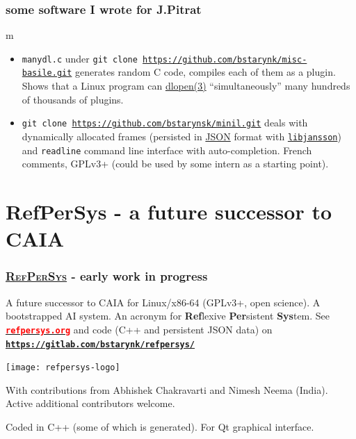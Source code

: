 \documentclass[xcolor=svgnames,final,smaller,a4]{beamer}
\newcommand{\RefPerSys}{\href{http://refpersys.org}{\textsc{RefPerSys}}}
\begin{document}
 \begin{frame}
   \frametitle{some software I wrote for J.Pitrat}
m
   \begin{itemize}
     \item \texttt{manydl.c} under \texttt{git clone
       \href{https://github.com/bstarynk/misc-basile.git}{https://github.com/bstarynk/misc-basile.git}}
       generates random C code, compiles each of them as a
       plugin. Shows that a Linux program can
       \href{http://man7.org/linux/man-pages/man3/dlopen.3.html}{dlopen(3)}
       ``simultaneously'' many hundreds of thousands of plugins.

    \item\texttt{git clone
      \href{https://github.com/bstarynk/minil.git}{https://github.com/bstarynsk/minil.git}}
      deals with dynamically allocated frames (persisted in
      \href{http://json.org}{JSON} format with
      \href{http://www.digip.org/jansson/}{\texttt{libjansson}}) and
      \texttt{readline} command line interface with
      auto-completion. French comments, GPLv3+ (could be used by some
      intern as a starting point).
      
   \end{itemize}
 \end{frame}


   \section{RefPerSys - a future successor to CAIA}
   \label{sec:refpersys}

  \begin{frame}
     \frametitle{{\RefPerSys} - early work in progress}

     A future successor to CAIA for Linux/x86-64 (GPLv3+, open science). A
     bootstrapped AI system. An acronym for \textbf{Ref}lexive
     \textbf{Per}sistent \textbf{Sys}tem. See
     \href{http://refpersys.org/}{\large\texttt{\textbf{\textcolor{red}{refpersys.org}}}}
     and code (C++ and persistent JSON data) on
     \href{https://gitlab.com/bstarynk/refpersys/}{\texttt{\textbf{https://gitlab.com/bstarynk/refpersys/}}}

     \begin{center}
       \texttt{[image: refpersys-logo]} \\
     \end{center}
     
     With contributions from Abhishek Chakravarti and Nimesh Neema (India). Active additional contributors welcome.

     Coded in C++ (some of which is generated). For Qt graphical interface.
  \end{frame}
\end{document}
